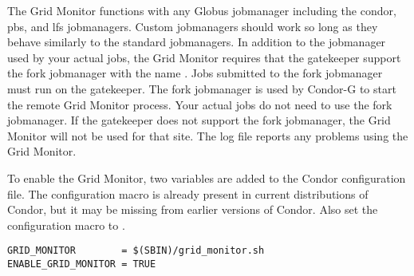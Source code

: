 The Grid Monitor functions with any Globus jobmanager including
the condor, pbs, and lfs jobmanagers.
Custom jobmanagers should work so long as they behave
similarly to the standard jobmanagers.
In addition to the jobmanager used by your actual jobs,
the Grid Monitor requires that the gatekeeper support the fork
jobmanager with the name .
Jobs submitted to the fork jobmanager must run on the gatekeeper.
The fork jobmanager is used by Condor-G to start the remote Grid
Monitor process.
Your actual jobs do not need to use the fork jobmanager.
If the gatekeeper does not support the fork jobmanager,
the Grid Monitor will not be used for that site.
The  log file reports any problems
using the Grid Monitor.

To enable the Grid Monitor,
two variables are added to the Condor configuration file.
The configuration macro 
is already present in current distributions of Condor,
but it may be missing from earlier versions of Condor.
Also set the configuration macro 
to .

\begin{verbatim}
GRID_MONITOR        = $(SBIN)/grid_monitor.sh
ENABLE_GRID_MONITOR = TRUE
\end{verbatim}

